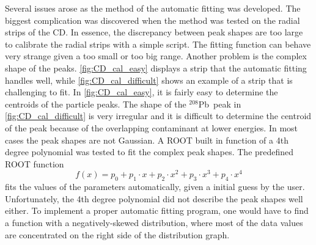 \documentclass[twoside,english]{uiofysmaster/uiofysmaster}
\newcommand{\Pb}{$^{208}$Pb}
\let\orgautoref\autoref
\renewcommand{\autoref}
        {%
		 \def\sectionautorefname{Section}%
		 \def\subsectionautorefname{Section}%
		 \def\subsubsectionautorefname{Section}%
		 \def\chapterautorefname{Chapter}%
          \orgautoref}
\begin{document}
Several issues arose as the method of the automatic fitting was developed. 
The biggest complication was discovered when the method was tested on the radial strips of the CD.
In essence, the discrepancy between peak shapes are too large to calibrate the radial strips with a simple script.
The fitting function can behave very strange given a too small or too big range.
Another problem is the complex shape of the peaks. 
\autoref{fig:CD_cal_easy} displays a strip that the automatic fitting handles well, while \autoref{fig:CD_cal_difficult} shows an example of a strip that is challenging to fit.
In \autoref{fig:CD_cal_easy}, it is fairly easy to determine the centroids of the particle peaks.
The shape of the \Pb\ peak in \autoref{fig:CD_cal_difficult} is very irregular and it is difficult to determine the centroid of the peak because of the overlapping contaminant at lower energies.
In most cases the peak shapes are not Gaussian. 
A ROOT built in function of a 4th degree polynomial was tested to fit the complex peak shapes. 
The predefined ROOT function 
\begin{equation}
	f(x) = p_0 + p_1 \cdot x + p_2 \cdot x^2 + p_3 \cdot x^3 + p_4 \cdot x^4
\end{equation}
fits the values of the parameters automatically, given a initial guess by the user. 
Unfortunately, the 4th degree polynomial did not describe the peak shapes well either.
To implement a proper automatic fitting program, one would have to find a function with a negatively-skewed distribution, where most of the data values are concentrated on the right side of the distribution graph. 
\end{document}
